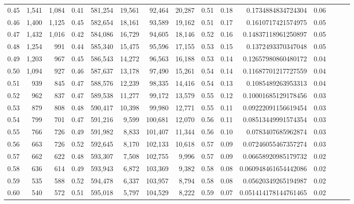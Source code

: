 \begin{tabular}{rrrrrrrrrrrrrrr}
0.45 &   1,541 &  1,084 &  0.41 &  581,254 &   19,561 &   92,464 &   20,287 &  0.51 &  0.18 &      0.1734884834724304 &      0.06 \\
0.46 &   1,400 &  1,125 &  0.45 &  582,654 &   18,161 &   93,589 &   19,162 &  0.51 &  0.17 &      0.1610717421574975 &      0.05 \\
0.47 &   1,432 &  1,016 &  0.42 &  584,086 &   16,729 &   94,605 &   18,146 &  0.52 &  0.16 &     0.14837118961250897 &      0.05 \\
0.48 &   1,254 &    991 &  0.44 &  585,340 &   15,475 &   95,596 &   17,155 &  0.53 &  0.15 &      0.1372493370347048 &      0.05 \\
0.49 &   1,203 &    967 &  0.45 &  586,543 &   14,272 &   96,563 &   16,188 &  0.53 &  0.14 &     0.12657980860480172 &      0.04 \\
0.50 &   1,094 &    927 &  0.46 &  587,637 &   13,178 &   97,490 &   15,261 &  0.54 &  0.14 &     0.11687701217727559 &      0.04 \\
0.51 &     939 &    845 &  0.47 &  588,576 &   12,239 &   98,335 &   14,416 &  0.54 &  0.13 &      0.1085489263953313 &      0.04 \\
0.52 &     962 &    837 &  0.47 &  589,538 &   11,277 &   99,172 &   13,579 &  0.55 &  0.12 &     0.10001685129178456 &      0.03 \\
0.53 &     879 &    808 &  0.48 &  590,417 &   10,398 &   99,980 &   12,771 &  0.55 &  0.11 &     0.09222091156619454 &      0.03 \\
0.54 &     799 &    701 &  0.47 &  591,216 &    9,599 &  100,681 &   12,070 &  0.56 &  0.11 &     0.08513449991574354 &      0.03 \\
0.55 &     766 &    726 &  0.49 &  591,982 &    8,833 &  101,407 &   11,344 &  0.56 &  0.10 &      0.0783407685962874 &      0.03 \\
0.56 &     663 &    726 &  0.52 &  592,645 &    8,170 &  102,133 &   10,618 &  0.57 &  0.09 &     0.07246055467357274 &      0.03 \\
0.57 &     662 &    622 &  0.48 &  593,307 &    7,508 &  102,755 &    9,996 &  0.57 &  0.09 &     0.06658920985179732 &      0.02 \\
0.58 &     636 &    614 &  0.49 &  593,943 &    6,872 &  103,369 &    9,382 &  0.58 &  0.08 &    0.060948461654442086 &      0.02 \\
0.59 &     535 &    588 &  0.52 &  594,478 &    6,337 &  103,957 &    8,794 &  0.58 &  0.08 &     0.05620349265194987 &      0.02 \\
0.60 &     540 &    572 &  0.51 &  595,018 &    5,797 &  104,529 &    8,222 &  0.59 &  0.07 &    0.051414178144761465 &      0.02 \\

\end{tabular}
